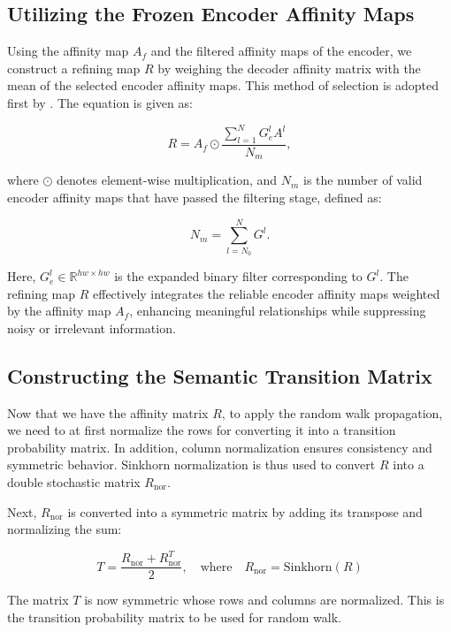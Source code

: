 \subsection{Utilizing the Frozen Encoder Affinity Maps}
\label{subsec: mul_attn_and_aff}
Using the affinity map $A_f$ and the filtered affinity maps of the encoder, we construct a refining map $R$ by weighing the decoder affinity matrix with the mean of the selected encoder affinity maps. This method of selection is adopted first by \cite{wsss_frozen_clip}. The equation is given as:

\begin{equation}
    R = A_f \odot \frac{ \sum_{l=1}^N G^l_e A^l}{N_m},
\end{equation}

where $\odot$ denotes element-wise multiplication, and $N_m$ is the number of valid encoder affinity maps that have passed the filtering stage, defined as:

\begin{equation}
    N_m = \sum_{l = N_0}^N G^l.
\end{equation}

Here, $G^l_e \in \mathbb{R}^{hw \times hw}$ is the expanded binary filter corresponding to $G^l$. The refining map $R$ effectively integrates the reliable encoder affinity maps weighted by the affinity map $A_f$, enhancing meaningful relationships while suppressing noisy or irrelevant information.

\subsection{Constructing the Semantic Transition Matrix}
\label{subsec:trans_mat}
Now that we have the affinity matrix $R$, to apply the random walk propagation, we need to at first normalize the rows for converting it into a transition probability matrix. In addition, column normalization ensures consistency and symmetric behavior. Sinkhorn normalization \cite{math_sinkhorn} is thus used to convert $R$ into a double stochastic matrix $R_{\text{nor}}$.

Next, $R_{\text{nor}}$ is converted into a symmetric matrix by adding its transpose and normalizing the sum:

\[
    T = \frac{R_{\text{nor}} + R_{\text{nor}}^T}{2}, \quad \text{where} \quad R_{\text{nor}} = \text{Sinkhorn}(R)
\]

The matrix $T$ is now symmetric whose rows and columns are normalized. This is the transition probability matrix to be used for random walk.


